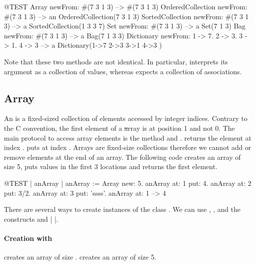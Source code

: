 \documentclass[a4paper,10pt,twoside]{book}
\begin{document}
\begin{code}{@TEST}
Array newFrom: #(7 3 1 3)                                          --> #(7 3 1 3)
OrderedCollection newFrom: #(7 3 1 3)                     --> an OrderedCollection(7 3 1 3)
SortedCollection newFrom: #(7 3 1 3)                       --> a SortedCollection(1 3 3 7)
Set newFrom: #(7 3 1 3)                                            --> a Set(7 1 3)
Bag newFrom: #(7 3 1 3)                                           --> a Bag(7 1 3 3)
Dictionary newFrom: {1 -> 7. 2 -> 3. 3 -> 1. 4 -> 3} --> a Dictionary(1->7 2->3 3->1 4->3 )
\end{code}
\noindent
Note that these two methods are not identical.
In particular,  interprets its argument as a collection of values, whereas  expects a collection of associations.

\subsection{Array}
An  is a fixed-sized collection of elements accessed by integer indices.
Contrary to the C convention, the first element of a \st array is at position 1 and not 0. 
The main protocol to access array elements is the method  and .  returns the element at index .  puts  at index . Arrays are fixed-size collections therefore we cannot add or remove elements at the end of an array. The following code creates an array of size 5, puts values in the first 3 locations and returns the first element. 

\begin{code}{@TEST | anArray | }
anArray := Array new: 5.
anArray at: 1 put: 4.
anArray at: 2 put: 3/2.
anArray at: 3 put: 'ssss'.
anArray at: 1 --> 4
\end{code}

There are several ways to create instances of the class . We can use , , and  the constructs \ct{#( )} and \ct|{ }|.

\paragraph{Creation with }  creates an array of size .
 creates an array of size 5.
\end{document}
